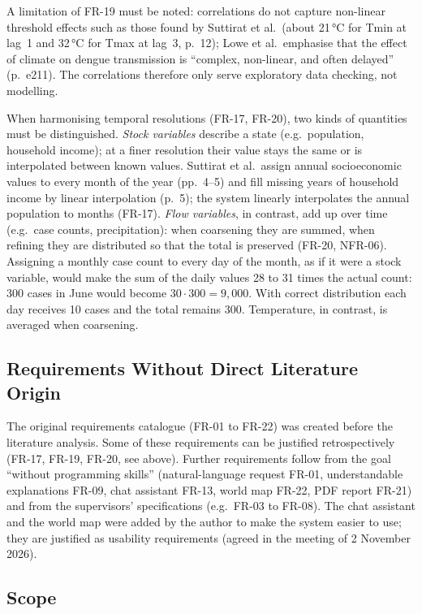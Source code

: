 \documentclass[11pt,a4paper]{article}
\begin{document}
\noindent A limitation of FR-19 must be noted: correlations do not capture
non-linear threshold effects such as those found by Suttirat et al.\ (about
21\,°C for Tmin at lag~1 and 32\,°C for Tmax at lag~3, p.~12); Lowe et al.\
emphasise that the effect of climate on dengue transmission is \enquote{complex,
non-linear, and often delayed} (p.~e211). The correlations therefore only serve
exploratory data checking, not modelling.

\noindent When harmonising temporal resolutions (FR-17, FR-20), two kinds of
quantities must be distinguished. \emph{Stock variables} describe a state (e.g.\
population, household income); at a finer resolution their value stays the same or
is interpolated between known values. Suttirat et al.\ assign annual socioeconomic
values to every month of the year (pp.~4--5) and fill missing years of household
income by linear interpolation (p.~5); the system linearly interpolates the annual
population to months (FR-17). \emph{Flow variables}, in contrast, add up over time
(e.g.\ case counts, precipitation): when coarsening they are summed, when refining
they are distributed so that the total is preserved (FR-20, NFR-06). Assigning a
monthly case count to every day of the month, as if it were a stock variable, would
make the sum of the daily values 28 to 31 times the actual count: 300 cases in June
would become $30 \cdot 300 = 9{,}000$. With correct distribution each day receives
10 cases and the total remains 300. Temperature, in contrast, is averaged
when coarsening.

\subsection{Requirements Without Direct Literature Origin}

The original requirements catalogue (FR-01 to FR-22) was created before the
literature analysis. Some of these requirements can be justified retrospectively
(FR-17, FR-19, FR-20, see above). Further requirements follow from the goal
\enquote{without programming skills} (natural-language request FR-01,
understandable explanations FR-09, chat assistant FR-13, world map FR-22, PDF
report FR-21) and from the supervisors' specifications (e.g.\ FR-03 to FR-08).
The chat assistant and the world map were added by the author to make the system
easier to use; they are justified as usability requirements (agreed in the meeting
of 2 November 2026).

\subsection{Scope}
\end{document}
